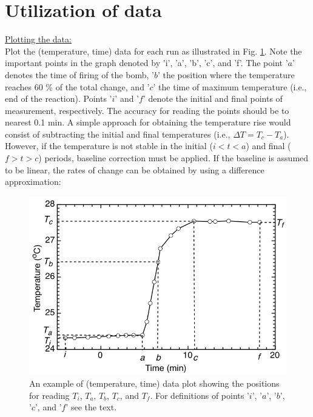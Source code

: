 \documentclass[byrevtex,amssymb,aps,pra,floatfix,letterpaper]{revtex4}
\begin{document}
\section{Utilization of data}

\noindent
\underline{Plotting the data:}\\

\noindent
Plot the (temperature, time) data for each run as illustrated in Fig. \ref{fig3}. Note the important points in the graph denoted by 'i', 'a', 'b', 'c', and 'f'. The point '$a$' denotes the time of firing of the bomb, '$b$' the position where the temperature reaches 60 \% of the total change, and '$c$' the time of maximum temperature (i.e., end of the reaction). Points '$i$' and '$f$' denote the initial and final points of measurement, respectively. The accuracy for reading the points should be to nearest 0.1 min. A simple approach for obtaining the temperature rise would consist of subtracting the initial and final temperatures (i.e., $\Delta T = T_c - T_a$). However, if the temperature is not stable in the initial ($i < t < a$) and final ($f > t > c$) periods, baseline correction must be applied. If the baseline is assumed to be linear, the rates of change can be obtained by using a difference approximation:

\begin{figure}[!htp]
\begin{center}
\includegraphics[scale=0.4]{graph}
\caption{An example of (temperature, time) data plot showing the positions for reading $T_i$, $T_a$, $T_b$, $T_c$, and $T_f$. For definitions of points '$i$', '$a$', '$b$', '$c$', and '$f$' see the text.}
\label{fig3}
\end{center}
\end{figure}
\end{document}
